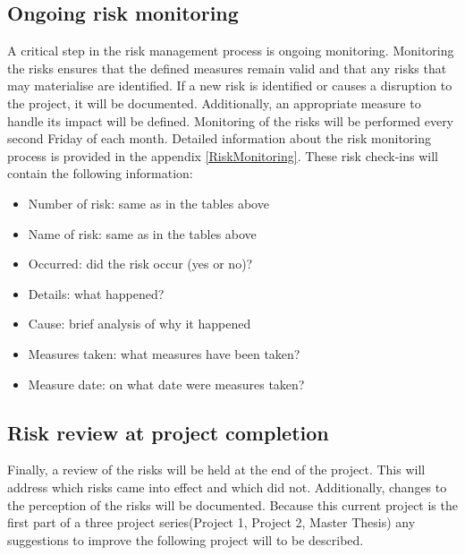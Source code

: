\subsection*{Ongoing risk monitoring}
A critical step in the risk management process is ongoing monitoring. Monitoring the risks ensures that the defined measures remain valid and that any risks that may materialise are identified. If a new risk is identified or causes a disruption to the project, it will be documented. Additionally, an appropriate measure to handle its impact will be defined. Monitoring of the risks will be performed every second Friday of each month. Detailed information about the risk monitoring process is provided in the appendix \ref{RiskMonitoring}.
These risk check-ins will contain the following information:

\begin{itemize}
\item Number of risk: same as in the tables above
\item Name of risk: same as in the tables above
\item Occurred: did the risk occur (yes or no)?
\item Details: what happened?
\item Cause: brief analysis of why it happened
\item Measures taken: what measures have been taken?
\item Measure date: on what date were measures taken?
\end{itemize}

\subsection*{Risk review at project completion}

Finally, a review of the risks will be held at the end of the project. This will address which risks came into effect and which did not. Additionally, changes to the perception of the risks will be documented. Because this current project is the first part of a three project series(Project 1, Project 2, Master Thesis) any suggestions to improve the following project will to be described.
